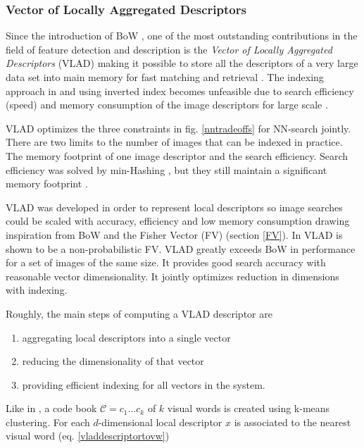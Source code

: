 \documentclass[english,12pt,a4paper,pdftex,elec,utf8]{aaltothesis}
\begin{document}
\subsubsection{Vector of Locally Aggregated Descriptors}
Since the introduction of BoW \cite{Sivic2003}, one of the most outstanding contributions in the field of feature detection and description is the \emph{Vector of Locally Aggregated Descriptors} (VLAD) making it possible to store all the descriptors of a very large data set into main memory for fast matching and retrieval \cite{Arandjelovic2013}. The indexing approach in \cite{Sivic2003} and \cite{Jegou2008} using inverted index becomes unfeasible due to search efficiency (speed) and memory consumption of the image descriptors for large scale \cite{Jegou2010}.

VLAD optimizes the three constraints in fig. \ref{nntradeoffs} for NN-search jointly. There are two limits to the number of images that can be indexed in practice. The memory footprint of one image descriptor and the search efficiency. Search efficiency was solved by min-Hashing \cite{Chum2008}, \cite{Chum2009} but they still maintain a significant memory footprint \cite{Jegou2010}.

VLAD was developed in order to represent local descriptors so image searches could be scaled with accuracy, efficiency and low memory consumption drawing inspiration from BoW and the Fisher Vector (FV) (section \ref{FV}). In \cite{Jegou2012} VLAD is shown to be a non-probabilistic FV. VLAD greatly exceeds BoW in performance for a set of images of the same size. It provides good search accuracy with reasonable vector dimensionality. It jointly optimizes reduction in dimensions with indexing. \cite{Jegou2010}

Roughly, the main steps of computing a VLAD descriptor are
\begin{enumerate}
\item aggregating local descriptors into a single vector
\item reducing the dimensionality of that vector
\item providing efficient indexing for all vectors in the system.
\end{enumerate}

Like in \cite{Sivic2003}, \cite{Jegou2011} a code book $\mathcal{C}={c_1 \ldots c_k}$ of $k$ visual words is created using k-means clustering. For each $d$-dimensional local descriptor $x$ is associated to the nearest visual word (eq. \ref{vladdescriptortovw})
\end{document}
